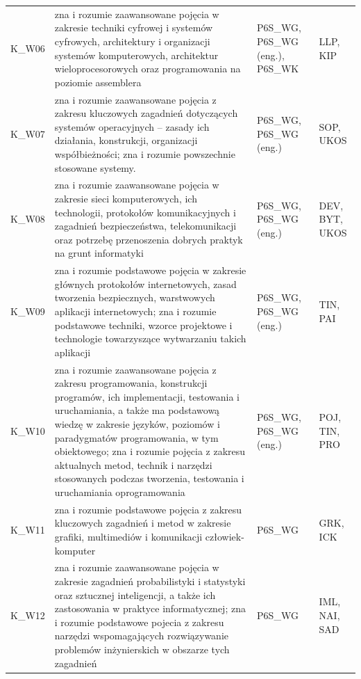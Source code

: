 \documentclass[12pt,a4paper]{article}
\begin{document}
{\begin{longtable}{m{1cm}m{8.8cm}m{2.1cm}m{2.5cm}}
\rowcolor{tableRowAlt} K\_W06 & zna i rozumie zaawansowane pojęcia w zakresie techniki cyfrowej i systemów cyfrowych, architektury i organizacji systemów komputerowych, architektur wieloprocesorowych oraz programowania na poziomie assemblera & {\scriptsize P6S\_WG, P6S\_WG {\scriptsize (eng.)}, P6S\_WK} & {\scriptsize LLP, KIP} \\
\rowcolor{tableRowLight} K\_W07 & zna i rozumie zaawansowane pojęcia z zakresu kluczowych zagadnień dotyczących systemów operacyjnych -- zasady ich działania, konstrukcji, organizacji współbieżności; zna i rozumie powszechnie stosowane systemy. & {\scriptsize P6S\_WG, P6S\_WG {\scriptsize (eng.)}} & {\scriptsize SOP, UKOS} \\
\rowcolor{tableRowAlt} K\_W08 & zna i rozumie zaawansowane pojęcia w zakresie sieci komputerowych, ich technologii, protokołów komunikacyjnych i zagadnień bezpieczeństwa, telekomunikacji oraz potrzebę przenoszenia dobrych praktyk na grunt informatyki & {\scriptsize P6S\_WG, P6S\_WG {\scriptsize (eng.)}} & {\scriptsize DEV, BYT, UKOS} \\
\rowcolor{tableRowLight} K\_W09 & zna i rozumie podstawowe pojęcia w zakresie głównych protokołów internetowych, zasad tworzenia bezpiecznych, warstwowych aplikacji internetowych; zna i rozumie podstawowe techniki, wzorce projektowe i technologie towarzyszące wytwarzaniu takich aplikacji & {\scriptsize P6S\_WG, P6S\_WG {\scriptsize (eng.)}} & {\scriptsize TIN, PAI} \\
\rowcolor{tableRowAlt} K\_W10 & zna i rozumie zaawansowane pojęcia z zakresu programowania, konstrukcji programów, ich implementacji, testowania i uruchamiania, a także ma podstawową wiedzę w zakresie języków, poziomów i paradygmatów programowania, w tym obiektowego; zna i rozumie pojęcia z zakresu aktualnych metod, technik i narzędzi stosowanych podczas tworzenia, testowania i uruchamiania oprogramowania & {\scriptsize P6S\_WG, P6S\_WG {\scriptsize (eng.)}} & {\scriptsize POJ, TIN, PRO} \\
\rowcolor{tableRowLight} K\_W11 & zna i rozumie podstawowe pojęcia z zakresu kluczowych zagadnień i metod w zakresie grafiki, multimediów i komunikacji człowiek-komputer & {\scriptsize P6S\_WG} & {\scriptsize GRK, ICK} \\
\rowcolor{tableRowAlt} K\_W12 & zna i rozumie zaawansowane pojęcia w zakresie zagadnień probabilistyki i statystyki oraz sztucznej inteligencji, a także ich zastosowania w praktyce informatycznej; zna i rozumie podstawowe pojecia z zakresu narzędzi wspomagających rozwiązywanie problemów inżynierskich w obszarze tych zagadnień & {\scriptsize P6S\_WG} & {\scriptsize IML, NAI, SAD} \\

\end{longtable}}
\end{document}
